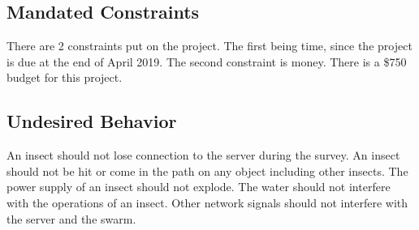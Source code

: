 \documentclass[11pt]{article}
\begin{document}
\subsection{Mandated Constraints}
There are 2 constraints put on the project. The first being time, since the project is due at the end of April 2019. The second constraint is money. There is a \$750 budget for this project.
\subsection{Undesired Behavior}
An insect should not lose connection to the server during the survey. An insect should not be hit or come in the path on any object including other insects. The power supply of an insect should not explode. The water should not interfere with the operations of an insect. Other network signals should not interfere with the server and the swarm. 
\end{document}
